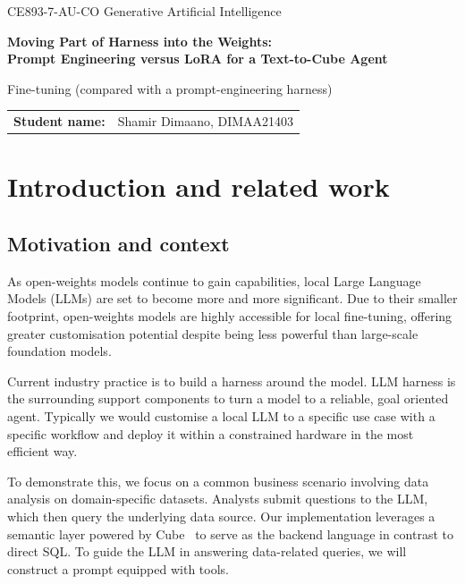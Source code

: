 \begin{center}
\vspace*{1.6cm}
{\small CE893-7-AU-CO \textbar{} Generative Artificial Intelligence}\par
\vspace{1.1cm}
{\Huge\bfseries\color{essexpurple}Moving Part of Harness into the Weights:\\[0.2em] Prompt Engineering versus LoRA for a Text-to-Cube Agent}\par
\vspace{0.5cm}
{\Large Fine-tuning (compared with a prompt-engineering harness)}\par
\vspace{1.4cm}
\begin{tabular}{rl}
\textbf{Student name:} & Shamir Dimaano, DIMAA21403
\end{tabular}
\vfill
\end{center}
\clearpage

\section{Introduction and related work}

\subsection{Motivation and context}
As open-weights models continue to gain capabilities, local Large Language Models (LLMs) are set to become more and more significant. Due to their smaller footprint, open-weights models are highly accessible for local fine-tuning, offering greater customisation potential despite being less powerful than large-scale foundation models.

Current industry practice is to build a harness around the model. LLM harness is the surrounding support components to turn a model to a reliable, goal oriented agent. Typically we would customise a local LLM to a specific use case with a specific workflow and deploy it within a constrained hardware in the most efficient way.

To demonstrate this, we focus on a common business scenario involving data analysis on domain-specific datasets. Analysts submit questions to the LLM, which then query the underlying data source. Our implementation leverages a semantic layer powered by Cube~\cite{cube} to serve as the backend language in contrast to direct SQL. To guide the LLM in answering data-related queries, we will construct a prompt equipped with tools.



